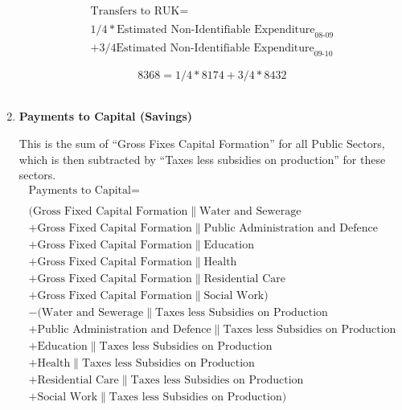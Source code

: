 \begin{enumerate}
\begin{equation}
\begin{split}
\text{Transfers to RUK} =  \\ \\
1/4*\text{Estimated Non-Identifiable Expenditure}_\text{08-09}\\
+3/4\text{Estimated Non-Identifiable Expenditure}_\text{09-10}
\end{split} \label{eq:2.5.45}
\end{equation}

\begin{equation} \nonumber
8368 = 1/4*8174+3/4*8432
\end{equation}\\


\item \textbf {Payments to Capital (Savings)}

This is the sum of “Gross Fixes Capital Formation” for all Public Sectors, which is then subtracted by “Taxes less subsidies on production” for these sectors. \cite{ScotGov2013a}\\

\begin{equation}
\begin{split}
\text{Payments to Capital} =  \\ \\
(\text{Gross Fixed Capital Formation}\|\text{Water and Sewerage}\\
+\text{Gross Fixed Capital Formation}\|\text{Public Administration and Defence}\\
+\text{Gross Fixed Capital Formation}\|\text{Education}\\
+\text{Gross Fixed Capital Formation}\|\text{Health}\\
+\text{Gross Fixed Capital Formation}\|\text{Residential Care}\\
+\text{Gross Fixed Capital Formation}\|\text{Social Work})\\
-(\text{Water and Sewerage}\|\text{Taxes less Subsidies on Production}\\
+\text{Public Administration and Defence}\|\text{Taxes less Subsidies on Production}\\
+\text{Education}\|\text{Taxes less Subsidies on Production}\\
+\text{Health}\|\text{Taxes less Subsidies on Production}\\
+\text{Residential Care}\|\text{Taxes less Subsidies on Production}\\
+\text{Social Work}\|\text{Taxes less Subsidies on Production})
\end{split} \label{eq:2.5.46}
\end{equation}


\end{enumerate}
